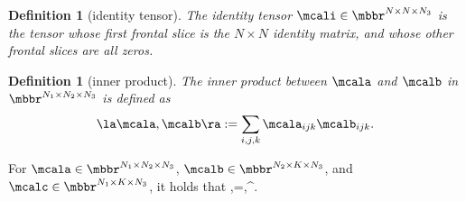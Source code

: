 \documentclass[11pt]{article}
\newtheorem{definition}[theorem]{Definition}
\begin{document}
\begin{definition}[identity tensor]
 The identity tensor $\mcali\in\mbbr^{N\times N\times N_3}$ is the tensor whose first frontal slice is the $N\times N$ identity matrix, and whose other frontal slices are all zeros.	
\end{definition}

\begin{definition}[inner product]
The inner product between $\mcala$ and $\mcalb$ in $\mbbr^{N_1\times N_2\times N_3}$ is defined as $$\la\mcala,\mcalb\ra:=\sum_{i,j,k}\mcala_{ijk}\mcalb_{ijk}.$$ 
\end{definition}

For $\mcala\in\mbbr^{N_1\times N_2\times N_3}$, $\mcalb\in\mbbr^{N_2\times K\times N_3}$, and $\mcalc\in\mbbr^{N_1\times K\times N_3}$, it holds that \beq\label{tran}\la\mcala*\mcalb,\mcalc\ra=\la\mcalb,\mcala^\top*\mcalc\ra.\eeq
\end{document}
